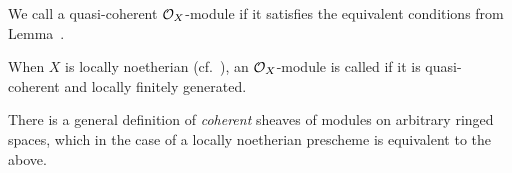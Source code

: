 \documentclass[a4paper,parskip=half,numbers=enddot, DIV=12]{scrreprt}
\begin{document}
\begin{defi}
	\begin{alphanumerate}
		\item {}We call a quasi-coherent $\mathcal{O}_X$-module  if it satisfies the equivalent conditions from Lemma~.
		\item When $X$ is locally noetherian (cf.\ \cite[Definition~2.2.2]{alggeo1}), an $\mathcal{O}_X$-module is called  if it is quasi-coherent and locally finitely generated.
	\end{alphanumerate}
\end{defi}
\begin{rem*}
	There is a general definition of \emph{coherent} sheaves of modules on arbitrary ringed spaces, which in the case of a locally noetherian prescheme is equivalent to the above.
\end{rem*}
\end{document}
